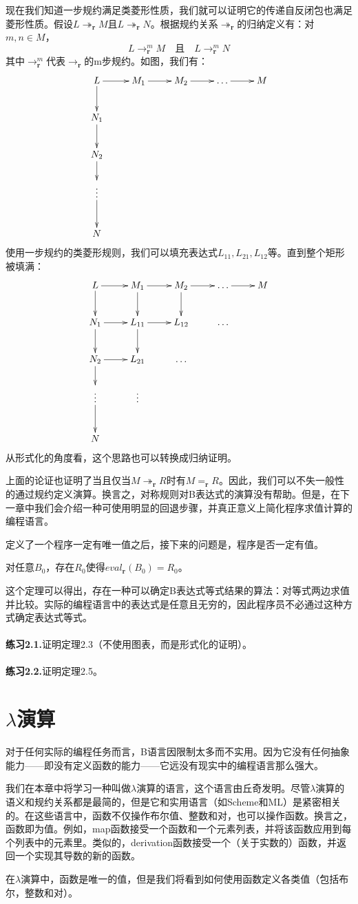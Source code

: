 \documentclass{book}
\def\r{\mathbf{r}}
\def\lianxi{\noindent \makebox[0pt][r]{$\rhd$} \textbf}
\begin{document}
现在我们知道一步规约满足类菱形性质，我们就可以证明它的传递自反闭包也满足菱形性质。假设$L\twoheadrightarrow_\r M$且$L\twoheadrightarrow_\r N$。根据规约关系$\twoheadrightarrow_\r$的归纳定义有：对$m,n\in M$，
$$
    L\rightarrow_\r ^mM\quad \text{且}\quad L\rightarrow_\r ^mN
$$
其中$\rightarrow_\r ^m$代表$\rightarrow_\r $的m步规约。如图，我们有：
$$
 \xymatrix{
  {L} \ar[r] \ar[d] & {M_1}\ar[r] & {M_2}\ar[r] & {\ldots}\ar[r] & {M}\\
  {N_1} \ar[d] \\
  {N_2} \ar[d] \\
  {\vdots} \ar[d] \\
  {N}
 }
$$
使用一步规约的类菱形规则，我们可以填充表达式$L_{11},L_{21},L_{12}$等。直到整个矩形被填满：
$$
 \xymatrix{
  {L} \ar[r] \ar[d] & {M_1}\ar[r]\ar[d] & {M_2}\ar[r]\ar[d] & {\ldots}\ar[r] & {M}\\
  {N_1} \ar[r] \ar[d] & {L_{11}} \ar[r]\ar[d]& {L_{12}} & {\ldots} \\
  {N_2} \ar[d] \ar[r] & {L_{21}} & {\ldots} \\
  {\vdots} \ar[d] & {\vdots}\\
  {N}
 }
 $$
从形式化的角度看，这个思路也可以转换成归纳证明。\par
上面的论证也证明了当且仅当$M\twoheadrightarrow_\r R$时有$M=_\r R$。因此，我们可以不失一般性的通过规约定义演算。换言之，对称规则对B表达式的演算没有帮助。但是，在下一章中我们会介绍一种可使用明显的回退步骤，并真正意义上简化程序求值计算的编程语言。\par
定义了一个程序一定有唯一值之后，接下来的问题是，程序是否一定有值。
\begin{Theorem}
对任意$B_0$，存在$R_0$使得$eval_\r (B_0)=R_0$。
\end{Theorem}
这个定理可以得出，存在一种可以确定B表达式等式结果的算法：对等式两边求值并比较。实际的编程语言中的表达式是任意且无穷的，因此程序员不必通过这种方式确定表达式等式。\\\\
\lianxi{练习2.1.}证明定理2.3（不使用图表，而是形式化的证明）。\\\\
\lianxi{练习2.2.}证明定理2.5。
\chapter{$\lambda$演算}
对于任何实际的编程任务而言，B语言因限制太多而不实用。因为它没有任何抽象能力——即没有定义函数的能力——它远没有现实中的编程语言那么强大。\par
我们在本章中将学习一种叫做$\lambda$演算的语言，这个语言由丘奇发明。尽管$\lambda$演算的语义和规约关系都是最简的，但是它和实用语言（如Scheme和ML）是紧密相关的。在这些语言中，函数不仅操作布尔值、整数和对，也可以操作函数。换言之，函数即为值。例如，map函数接受一个函数和一个元素列表，并将该函数应用到每个列表中的元素里。类似的，derivation函数接受一个（关于实数的）函数，并返回一个实现其导数的新的函数。\par
在$\lambda$演算中，函数是唯一的值，但是我们将看到如何使用函数定义各类值（包括布尔，整数和对）。\par
\end{document}
